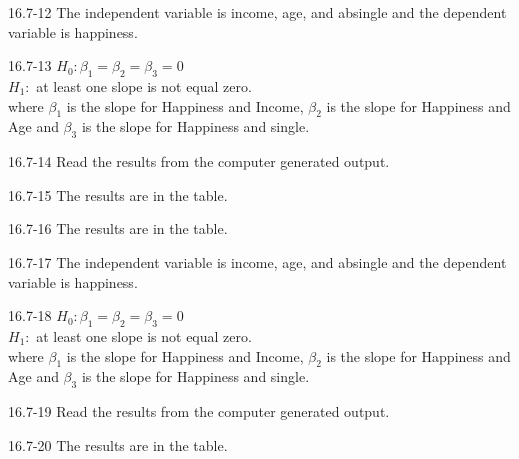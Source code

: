 \begin{exsol@solution}{16.7-12}
       The independent variable is income,   age, and absingle and the dependent variable is happiness.

\end{exsol@solution}
\begin{exsol@solution}{16.7-13}
       $H_0: \beta_1 = \beta_2 = \beta_3 = 0$ \\
       $H_1:$ at least one slope is not equal zero. \\
       where $\beta_1$ is the slope for Happiness and Income,  $\beta_2$ is the slope for Happiness and Age and $\beta_3$ is         the slope for Happiness and single.

\end{exsol@solution}
\begin{exsol@solution}{16.7-14}
       Read the results from the computer generated output.

\end{exsol@solution}
\begin{exsol@solution}{16.7-15}
      The results are in the table.

\end{exsol@solution}
\begin{exsol@solution}{16.7-16}
  The results are in the table.

\end{exsol@solution}
\begin{exsol@solution}{16.7-17}
       The independent variable is income,   age, and absingle and the dependent variable is happiness.

\end{exsol@solution}
\begin{exsol@solution}{16.7-18}
       $H_0: \beta_1 = \beta_2 = \beta_3 = 0$ \\
       $H_1:$ at least one slope is not equal zero. \\
       where $\beta_1$ is the slope for Happiness and Income,  $\beta_2$ is the slope for Happiness and Age and $\beta_3$ is         the slope for Happiness and single.

\end{exsol@solution}
\begin{exsol@solution}{16.7-19}
       Read the results from the computer generated output.

\end{exsol@solution}
\begin{exsol@solution}{16.7-20}
      The results are in the table.

\end{exsol@solution}
